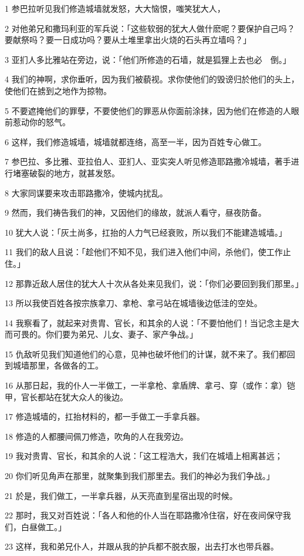 \par 1 参巴拉听见我们修造城墙就发怒，大大恼恨，嗤笑犹大人，
\par 2 对他弟兄和撒玛利亚的军兵说：「这些软弱的犹大人做什麽呢？要保护自己吗？要献祭吗？要一日成功吗？要从土堆里拿出火烧的石头再立墙吗？」
\par 3 亚扪人多比雅站在旁边，说：「他们所修造的石墙，就是狐狸上去也必　倒。」
\par 4 我们的神啊，求你垂听，因为我们被藐视。求你使他们的毁谤归於他们的头上，使他们在掳到之地作为掠物。
\par 5 不要遮掩他们的罪孽，不要使他们的罪恶从你面前涂抹，因为他们在修造的人眼前惹动你的怒气。
\par 6 这样，我们修造城墙，城墙就都连络，高至一半，因为百姓专心做工。
\par 7 参巴拉、多比雅、亚拉伯人、亚扪人、亚实突人听见修造耶路撒冷城墙，著手进行堵塞破裂的地方，就甚发怒。
\par 8 大家同谋要来攻击耶路撒冷，使城内扰乱。
\par 9 然而，我们祷告我们的神，又因他们的缘故，就派人看守，昼夜防备。
\par 10 犹大人说：「灰土尚多，扛抬的人力气已经衰败，所以我们不能建造城墙。」
\par 11 我们的敌人且说：「趁他们不知不见，我们进入他们中间，杀他们，使工作止住。」
\par 12 那靠近敌人居住的犹大人十次从各处来见我们，说：「你们必要回到我们那里。」
\par 13 所以我使百姓各按宗族拿刀、拿枪、拿弓站在城墙後边低洼的空处。
\par 14 我察看了，就起来对贵胄、官长，和其余的人说：「不要怕他们！当记念主是大而可畏的。你们要为弟兄、儿女、妻子、家产争战。」
\par 15 仇敌听见我们知道他们的心意，见神也破坏他们的计谋，就不来了。我们都回到城墙那里，各做各的工。
\par 16 从那日起，我的仆人一半做工，一半拿枪、拿盾牌、拿弓、穿（或作：拿）铠甲，官长都站在犹大众人的後边。
\par 17 修造城墙的，扛抬材料的，都一手做工一手拿兵器。
\par 18 修造的人都腰间佩刀修造，吹角的人在我旁边。
\par 19 我对贵胄、官长，和其余的人说：「这工程浩大，我们在城墙上相离甚远；
\par 20 你们听见角声在那里，就聚集到我们那里去。我们的神必为我们争战。」
\par 21 於是，我们做工，一半拿兵器，从天亮直到星宿出现的时候。
\par 22 那时，我又对百姓说：「各人和他的仆人当在耶路撒冷住宿，好在夜间保守我们，白昼做工。」
\par 23 这样，我和弟兄仆人，并跟从我的护兵都不脱衣服，出去打水也带兵器。

